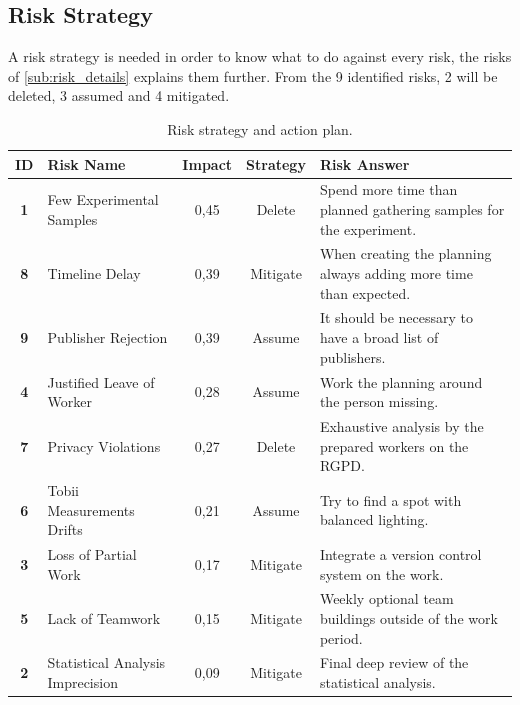 \subsection{Risk Strategy}
A risk strategy is needed in order to know what to do against every risk, the risks of 
\ref{sub:risk_details} explains them further. From the 9 identified risks, 2 will be deleted, 3 assumed and 4 mitigated.
\begin{table} [H]
    \centering
    \small
    \caption{Risk strategy and action plan.}
    \label{tab:risk_strategy}
    \setlength{\tabcolsep}{4pt}
    
    
    \begin{tabularx}{\textwidth} { 
        | c %
        | >{\raggedright\arraybackslash}X %
        | c %
        | c %
        | >{\raggedright\arraybackslash}p{6cm} | 
    }
        \hline 
        \textbf{ID} & \textbf{Risk Name} & \textbf{Impact} & \textbf{Strategy} & \textbf{Risk Answer}\\
        \hline
        \textbf{1} & Few Experimental Samples & \cellcolor{orange} 0,45 & Delete & Spend more time than planned gathering samples for the experiment. \\ \hline
        \textbf{8} & Timeline Delay & \cellcolor{YellowOrange} 0,39 & Mitigate & When creating the planning always adding more time than expected. \\ \hline
        \textbf{9} & Publisher Rejection & \cellcolor{YellowOrange} 0,39 & Assume & It should be necessary to have a broad list of publishers. \\ \hline
        \textbf{4} & Justified Leave of Worker & \cellcolor{yellow} 0,28 & Assume & Work the planning around the person missing. \\ \hline    
        \textbf{7} & Privacy Violations & \cellcolor{yellow} 0,27 & Delete & Exhaustive analysis by the prepared workers on the RGPD. \\ \hline
        \textbf{6} & Tobii Measurements Drifts & \cellcolor{yellow} 0,21 & Assume & Try to find a spot with balanced lighting. \\ \hline
        \textbf{3} & Loss of Partial Work & \cellcolor{green!40} 0,17 & Mitigate & Integrate a version control system on the work. \\ \hline
        \textbf{5} & Lack of Teamwork & \cellcolor{green!40} 0,15 & Mitigate & Weekly optional team buildings outside of the work period. \\ \hline
        \textbf{2} & Statistical Analysis Imprecision & \cellcolor{green!40} 0,09 & Mitigate & Final deep review of the statistical analysis. \\ \hline
    \end{tabularx}
\end{table}
\newpage
